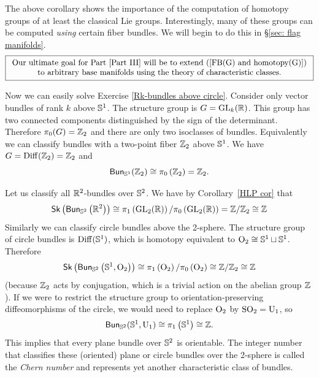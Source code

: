 The above corollary shows the importance of the computation of homotopy groups of at least the classical Lie groups. Interestingly, many of these groups can be computed \emph{using} certain fiber bundles. We will begin to do this in \S\ref{sec: flag manifolds}.
\[\boxed{\begin{array}{c}
    \text{Our ultimate goal for Part \ref{Part III} will be to extend (\ref{FB(G) and homotopy(G)})}\\
    \text{to arbitrary base manifolds using the theory of characteristic classes.}
\end{array}}
\] 


\begin{example}
    Now we can easily solve Exercise \ref{Rk-bundles above circle}. Consider only vector bundles of rank $k$ above $\mathbb{S}^1$. The structure group is $G=\operatorname{GL}_k(\mathbb{R})$. This group has two connected components distinguished by the sign of the determinant. Therefore $\pi_0(G)=\mathbb{Z}_2$ and there are only two isoclasses of bundles. Equivalently we can classify bundles with a two-point fiber $\mathbb{Z}_2$ above $\mathbb{S}^1$. We have $G=\operatorname{Diff}(\mathbb{Z}_2)=\mathbb{Z}_2$ and
    \[
        \mathsf{Bun}_{\mathbb{S}^1}(\mathbb{Z}_2)\cong \pi_{0}\left(\mathbb{Z}_2\right)=\mathbb{Z}_2.
    \]
    \end{example}
    \begin{example}
    Let us classify all $\mathbb{R}^2$-bundles over $\mathbb{S}^2$. We have by Corollary~\ref{HLP cor} that 
    \[
        \mathsf{Sk}\left(\mathsf{Bun}_{\mathbb{S}^2}\left(\mathbb{R}^2\right)\right)\cong \pi_{1}\left(\operatorname{GL}_2(\mathbb{R} )\right)/\pi_0\left(\operatorname{GL}_2(\mathbb{R} )\right)=\mathbb{Z}/\mathbb{Z}_2\cong \mathbb{Z}
    \]
    Similarly we can classify circle bundles above the 2-sphere. The structure group of circle bundles is $\operatorname{Diff}(\mathbb{S}^1)$, which is homotopy equivalent to $\operatorname{O}_2\cong \mathbb{S}^1\sqcup \mathbb{S}^1$. Therefore
    \[
        \mathsf{Sk}\left(\mathsf{Bun}_{\mathbb{S}^2}\left(\mathbb{S}^1,\operatorname{O}_2\right)\right)\cong \pi_{1}\left(\operatorname{O}_2\right)/\pi_0\left(\operatorname{O}_2\right)\cong\mathbb{Z}/\mathbb{Z}_2\cong\mathbb{Z}
    \]
    (because $\mathbb{Z}_2$ acts by conjugation, which is a trivial action on the abelian group $\mathbb{Z}$). If we were to restrict the structure group to orientation-preserving diffeomorphisms of the circle, we would need to replace $\operatorname{O}_2$ by $\operatorname{SO}_2=\operatorname{U}_1$, so 
    \[
        \mathsf{Bun}_{\mathbb{S}^2}(\mathbb{S}^1,\operatorname{U}_1)\cong \pi_{1}\left(\mathbb{S}^1\right)\cong\mathbb{Z}.
    \]
    This implies that every plane bundle over $\mathbb{S}^2$ is orientable. The integer number that classifies these (oriented) plane or circle bundles over the 2-sphere is called the \emph{Chern number} and represents yet another characteristic class of bundles.
\end{example}

